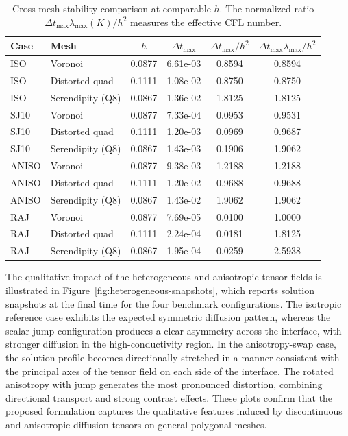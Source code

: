 \documentclass{article}
\begin{document}
\begin{table}[htbp]
    \centering
    \caption{Cross-mesh stability comparison at comparable $h$. The normalized ratio $\Delta t_{\max}\lambda_{\max}(K)/h^2$ measures the effective CFL number.}
    \label{tab:cross_mesh}
    \begin{tabular}{l l c c c c}
    \toprule
    Case & Mesh & $h$ & $\Delta t_{\max}$ & $\Delta t_{\max}/h^2$ & $\Delta t_{\max}\lambda_{\max}/h^2$ \\
    \midrule
    ISO   & Voronoi          & 0.0877 & 6.61e-03 & 0.8594 & 0.8594 \\
    ISO   & Distorted quad   & 0.1111 & 1.08e-02 & 0.8750 & 0.8750 \\
    ISO   & Serendipity (Q8) & 0.0867 & 1.36e-02 & 1.8125 & 1.8125 \\
    \addlinespace

    SJ10  & Voronoi          & 0.0877 & 7.33e-04 & 0.0953 & 0.9531 \\
    SJ10  & Distorted quad   & 0.1111 & 1.20e-03 & 0.0969 & 0.9687 \\
    SJ10  & Serendipity (Q8) & 0.0867 & 1.43e-03 & 0.1906 & 1.9062 \\
    \addlinespace

    ANISO & Voronoi          & 0.0877 & 9.38e-03 & 1.2188 & 1.2188 \\
    ANISO & Distorted quad   & 0.1111 & 1.20e-02 & 0.9688 & 0.9688 \\
    ANISO & Serendipity (Q8) & 0.0867 & 1.43e-02 & 1.9062 & 1.9062 \\
    \addlinespace

    RAJ   & Voronoi          & 0.0877 & 7.69e-05 & 0.0100 & 1.0000 \\
    RAJ   & Distorted quad   & 0.1111 & 2.24e-04 & 0.0181 & 1.8125 \\
    RAJ   & Serendipity (Q8) & 0.0867 & 1.95e-04 & 0.0259 & 2.5938 \\
    \bottomrule
    \end{tabular}
\end{table}

The qualitative impact of the heterogeneous and anisotropic tensor fields is illustrated in Figure~\ref{fig:heterogeneous-snapshots}, which reports solution snapshots at the final time for the four benchmark configurations. The isotropic reference case exhibits the expected symmetric diffusion pattern, whereas the scalar-jump configuration produces a clear asymmetry across the interface, with stronger diffusion in the high-conductivity region. In the anisotropy-swap case, the solution profile becomes directionally stretched in a manner consistent with the principal axes of the tensor field on each side of the interface. The rotated anisotropy with jump generates the most pronounced distortion, combining directional transport and strong contrast effects. These plots confirm that the proposed formulation captures the qualitative features induced by discontinuous and anisotropic diffusion tensors on general polygonal meshes.
\end{document}
